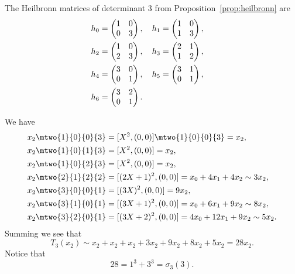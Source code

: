 \begin{example}
The Heilbronn matrices of determinant $3$ from 
Proposition~\ref{prop:heilbronn} are
\begin{align*}
h_0&=\left(\begin{matrix}
\hfill{}1&\hfill{}0\\
\hfill{}0&\hfill{}3
\end{matrix}\right),\quad{}
h_1=\left(\begin{matrix}
\hfill{}1&\hfill{}0\\
\hfill{}1&\hfill{}3
\end{matrix}\right),\quad{}\\
h_2&=\left(\begin{matrix}
\hfill{}1&\hfill{}0\\
\hfill{}2&\hfill{}3
\end{matrix}\right),\quad{}
h_3=\left(\begin{matrix}
\hfill{}2&\hfill{}1\\
\hfill{}1&\hfill{}2
\end{matrix}\right),\quad{}\\
h_4&=\left(\begin{matrix}
\hfill{}3&\hfill{}0\\
\hfill{}0&\hfill{}1
\end{matrix}\right),\quad{}
h_5=\left(\begin{matrix}
\hfill{}3&\hfill{}1\\
\hfill{}0&\hfill{}1
\end{matrix}\right),\quad{}\\
h_6&=\left(\begin{matrix}
\hfill{}3&\hfill{}2\\
\hfill{}0&\hfill{}1
\end{matrix}\right).
\end{align*}

We have
\begin{align*}
  x_2 \mtwo{1}{0}{0}{3} &= [X^2,(0,0)] \mtwo{1}{0}{0}{3} =
         x_2,\\
  x_2 \mtwo{1}{0}{1}{3} &= [X^2,(0,0)] = x_2,\\
  x_2 \mtwo{1}{0}{2}{3} &= [X^2,(0,0)] = x_2,\\
  x_2 \mtwo{2}{1}{2}{2} &= [(2X+1)^2,(0,0)] = x_0 + 4x_1 + 4x_2
                                            \sim 3x_2,\\
  x_2 \mtwo{3}{0}{0}{1} &= [(3X)^2,(0,0)] = 9x_2,\\
  x_2 \mtwo{3}{1}{0}{1} &= [(3X+1)^2,(0,0)] = x_0 + 6x_1 + 9x_2 \sim 8x_2,\\
  x_2 \mtwo{3}{2}{0}{1} &= [(3X+2)^2,(0,0)] = 4x_0 + 12x_1 + 9x_2 \sim 5x_2.\\
\end{align*}
Summing we see that 
$$T_3(x_2) \sim x_2 + x_2 + x_2 + 3x_2 + 9x_2 + 8x_2 + 5x_2
           = 28 x_2.
$$
Notice that 
$$28=1^3+3^3 = \sigma_3(3).$$

\end{example}

